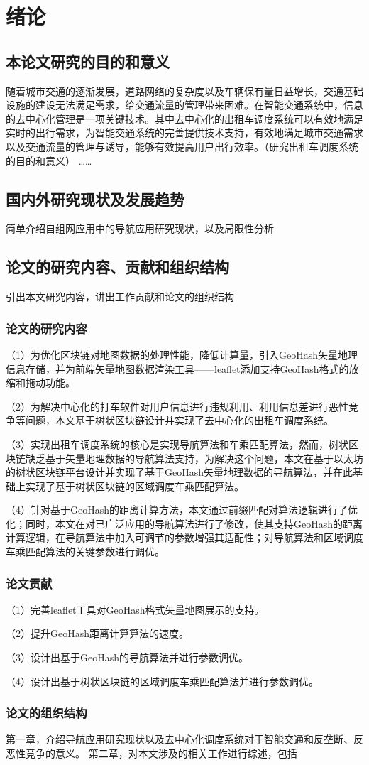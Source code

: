 \chapter{绪论}
\section{本论文研究的目的和意义}

随着城市交通的逐渐发展，道路网络的复杂度以及车辆保有量日益增长，交通基础设施的建设无法满足需求，给交通流量的管理带来困难。在智能交通系统中，信息的去中心化管理是一项关键技术。其中去中心化的出租车调度系统可以有效地满足实时的出行需求，为智能交通系统的完善提供技术支持，有效地满足城市交通需求以及交通流量的管理与诱导，能够有效提高用户出行效率。（研究出租车调度系统的目的和意义）
……

\section{国内外研究现状及发展趋势}
简单介绍自组网应用中的导航应用研究现状，以及局限性分析
\section{论文的研究内容、贡献和组织结构}
引出本文研究内容，讲出工作贡献和论文的组织结构
\subsection{论文的研究内容}
（1）为优化区块链对地图数据的处理性能，降低计算量，引入GeoHash矢量地理信息存储，并为前端矢量地图数据渲染工具——leaflet添加支持GeoHash格式的放缩和拖动功能。\par
（2）为解决中心化的打车软件对用户信息进行违规利用、利用信息差进行恶性竞争等问题，本文基于树状区块链设计并实现了去中心化的出租车调度系统。\par
（3）实现出租车调度系统的核心是实现导航算法和车乘匹配算法，然而，树状区块链缺乏基于矢量地理数据的导航算法支持，为解决这个问题，本文在基于以太坊的树状区块链平台设计并实现了基于GeoHash矢量地理数据的导航算法，并在此基础上实现了基于树状区块链的区域调度车乘匹配算法。\par
（4）针对基于GeoHash的距离计算方法，本文通过前缀匹配对算法逻辑进行了优化；同时，本文在对已广泛应用的导航算法进行了修改，使其支持GeoHash的距离计算逻辑，在导航算法中加入可调节的参数增强其适配性；对导航算法和区域调度车乘匹配算法的关键参数进行调优。
\subsection{论文贡献}
（1）完善leaflet工具对GeoHash格式矢量地图展示的支持。\par
（2）提升GeoHash距离计算算法的速度。\par
（3）设计出基于GeoHash的导航算法并进行参数调优。\par
（4）设计出基于树状区块链的区域调度车乘匹配算法并进行参数调优。
\subsection{论文的组织结构}
第一章，介绍导航应用研究现状以及去中心化调度系统对于智能交通和反垄断、反恶性竞争的意义。
第二章，对本文涉及的相关工作进行综述，包括